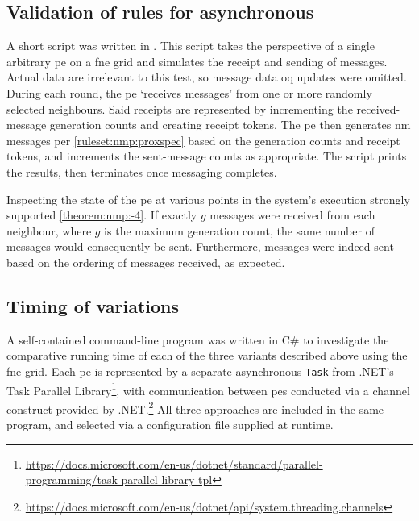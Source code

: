 

\subsection{Validation of rules for asynchronous \texorpdfstring{}{neighbourhood message passing}}
A short script was written in \fsharp{}.  This script takes the perspective of a single arbitrary \gls{pe} on a \gls{fne} grid and simulates the receipt and sending of messages.  Actual data are irrelevant to this test, so message data \gls{oq} updates were omitted.  During each round, the \gls{pe} `receives messages' from one or more randomly selected neighbours.  Said receipts are represented by incrementing the received-message generation counts and creating receipt tokens.  The \gls{pe} then generates \gls{nm} messages per \cref{ruleset:nmp:proxspec} based on the generation counts and receipt tokens, and increments the sent-message counts as appropriate.  The script prints the results, then terminates once messaging completes.

Inspecting the state of the \gls{pe} at various points in the system's execution strongly supported \cref{theorem:nmp:-4}.  If exactly \(g\) messages were received from each neighbour, where \(g\) is the maximum generation count, the same number of messages would consequently be sent.  Furthermore, messages were indeed sent based on the ordering of messages received, as expected.

\subsection{\label{sec:nmp:timingexp}Timing of variations}
A self-contained command-line program was written in C\# to investigate the comparative running time of each of the three variants described above using the \gls{fne} grid.  Each \gls{pe} is represented by a separate asynchronous \texttt{Task} from .NET's Task Parallel Library{\footnote{\raggedright\url{https://docs.microsoft.com/en-us/dotnet/standard/parallel-programming/task-parallel-library-tpl}}}, with communication between \glspl{pe} conducted via a channel construct provided by .NET.\footnote{\url{https://docs.microsoft.com/en-us/dotnet/api/system.threading.channels}}  All three approaches are included in the same program, and selected via a configuration file supplied at runtime.

